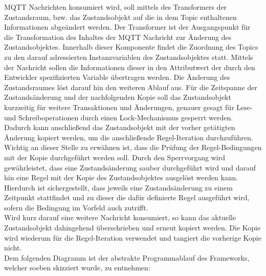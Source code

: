         \acs{MQTT} Nachrichten konsumiert wird, soll mittels des Transformers der Zustandsraum, bzw. das Zustandsobjekt 
        auf die in dem Topic enthaltenen Informationen abgeändert werden. Der Transformer ist der Ausgangspunkt für die Transformation 
        des Inhaltes der \acs{MQTT} Nachricht zur Änderung des Zustandsobjektes. Innerhalb dieser Komponente findet die Zuordnung 
        des Topics zu den darauf adressierten Instanzvariablen des Zustandsobjektes statt. Mittels der Nachricht sollen die Informationen dieser 
        in den Attributwert der durch den Entwickler spezifizierten Variable übertragen werden. Die Änderung des Zustandsraumes löst darauf hin 
        den weiteren Ablauf aus.
        Für die Zeitspanne der Zustandsänderung und der 
        nachfolgenden Kopie soll das Zustandsobjekt kurzzeitig für weitere Transaktionen und Änderungen, genauer gesagt für Lese- und 
        Schreiboperationen durch einen Lock-Mechanismus gesperrt werden. Dadurch kann anschließend das Zustandsobjekt mit der vorher 
        getätigten Änderung kopiert werden, um die anschließende Regel-Iteration durchzuführen. Wichtig an dieser Stelle zu 
        erwähnen ist, dass die Prüfung der Regel-Bedingungen mit der Kopie durchgeführt werden soll. 
        Durch den Sperrvorgang wird gewährleistet, dass eine Zustandsänderung sauber durchgeführt wird und darauf hin eine Regel mit der 
        Kopie des Zustandsobjektes ausgelöst werden kann. Hierdurch ist sichergestellt, dass jeweils eine Zustandsänderung zu einem 
        Zeitpunkt stattfindet und zu dieser die dafür definierte Regel ausgeführt wird, sofern die Bedingung im Vorfeld auch zutrifft. 
        \\
        Wird kurz darauf eine weitere Nachricht konsumiert, so kann das aktuelle Zustandsobjekt dahingehend überschrieben und erneut 
        kopiert werden. Die Kopie wird wiederum für die Regel-Iteration verwendet und tangiert die vorherige Kopie nicht. 
        \\
        \linebreak
        Dem folgenden Diagramm ist der abstrakte Programmablauf des Frameworks, welcher soeben skizziert wurde, zu entnehmen:
